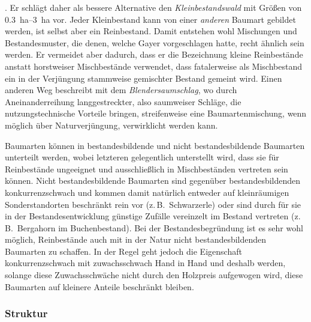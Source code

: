 \documentclass[twocolumn, paper=a4, fontsize=10pt, bibliography=totoc, index=totoc]{scrartcl}
\begin{document}
\citep[S.~547]{mayr1909WaldbauAufNaturgesetzlicherGrundlage}. Er
schlägt daher als bessere Alternative den \emph{Kleinbestandswald} mit
Größen von \qtyrange{0.3}{3}{\hectare} vor. Jeder Kleinbestand kann von einer
\emph{anderen} Baumart gebildet werden, ist selbst aber ein
Reinbestand. Damit entstehen wohl Mischungen und Bestandesmuster, die
denen, welche Gayer vorgeschlagen hatte, recht ähnlich sein werden. Er
vermeidet aber dadurch, dass er die Bezeichnung kleine Reinbestände anstatt horstweiser Mischbestände verwendet, dass fatalerweise als
Mischbestand ein in der Verjüngung stammweise gemischter Bestand
gemeint wird. Einen anderen Weg beschreibt
\citet{wagner1923DerBlendersaumschlagUndSeinSystem} mit dem
\emph{Blendersaumschlag}, wo durch Aneinanderreihung langgestreckter,
also saumweiser Schläge, die nutzungstechnische Vorteile bringen,
streifenweise eine Baumartenmischung, wenn möglich über
Naturverjüngung, verwirklicht werden kann.

Baumarten können in bestandesbildende und nicht bestandesbildende
Baumarten unterteilt werden, wobei letzteren gelegentlich unterstellt
wird, dass sie für Reinbestände ungeeignet und ausschließlich in
Mischbeständen vertreten sein können. Nicht bestandesbildende
Baumarten sind gegenüber bestandesbildenden konkurrenzschwach und
kommen damit natürlich entweder auf kleinräumigen Sonderstandorten
beschränkt rein vor (z.\,B.\ Schwarzerle) oder sind durch für sie in der
Bestandesentwicklung günstige Zufälle vereinzelt im Bestand vertreten
(z.\,B.\ Bergahorn im Buchenbestand). Bei der Bestandesbegründung ist es
sehr wohl möglich, Reinbestände auch mit in der Natur nicht bestandesbildenden
Baumarten zu schaffen. In der Regel geht jedoch die Eigenschaft
konkurrenzschwach mit zuwachsschwach Hand in Hand und deshalb werden,
solange diese Zuwachsschwäche nicht durch den Holzpreis aufgewogen
wird, diese Baumarten auf kleinere Anteile beschränkt bleiben.

\subsubsection{Struktur}
\label{sssec:struktur}
\end{document}
